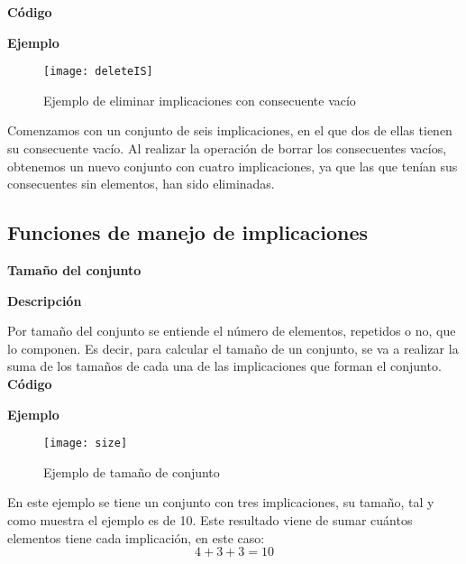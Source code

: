     \textbf{C\'odigo}

    
    \bigskip

    \textbf{Ejemplo}

    \begin{figure}[H]
        \centering
        \texttt{[image: deleteIS]}
        \caption{Ejemplo de eliminar implicaciones con consecuente vac\'io}
        \label{fig:deleteIS}
    \end{figure}

    Comenzamos con un conjunto de seis implicaciones, en el que dos de ellas tienen su consecuente vac\'io. Al realizar la 
    operaci\'on de borrar los consecuentes vac\'ios, obtenemos un nuevo conjunto con cuatro implicaciones, ya que las que ten\'ian 
    sus consecuentes sin elementos, han sido eliminadas.

    \clearpage

\subsection{Funciones de manejo de implicaciones}

\smallskip

\textbf{ \large Tama\~no del conjunto}

\smallskip

    \textbf{Descripci\'on}

    Por tama\~no del conjunto se entiende el n\'umero de elementos, repetidos o no, que lo componen. 
    Es decir, para calcular el tama\~no de un conjunto, se va a realizar la suma de los tama\~nos de cada una de 
    las implicaciones que forman el conjunto.
    \\


    \textbf{C\'odigo}

    
    \bigskip

    \textbf{Ejemplo}

    \begin{figure}[H]
        \centering
        \texttt{[image: size]}
        \caption{Ejemplo de tama\~no de conjunto}
        \label{fig:size}
    \end{figure}

    En este ejemplo se tiene un conjunto con tres implicaciones, su tama\~no, tal y como muestra el ejemplo es de 10. 
    Este resultado viene de sumar cu\'antos elementos tiene cada implicaci\'on, en este caso:
    \[
        4 + 3 + 3 = 10    
    \]

